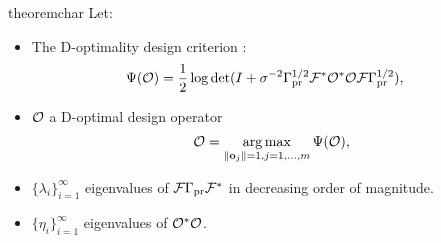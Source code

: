 \begin{restatable}{theorem}{char}\label{thm:char}
  Let:
  \begin{itemize}
    \item The D-optimality design criterion
    \cite{AlexanderianGloorGhattas14}:
    \begin{align*}
      \begin{split}
        \tar(\obs) %
        &= \frac12 \log \det ( I + \sigma^{-2} \prcov^{1/2} \fwd ^*
        \obs^* \obs \fwd \prcov^{1/2}), 
      \end{split}
    \end{align*}
  \item \(\mathcal{O}\) a D-optimal design operator
    \begin{equation*}
      \obs = \argmax_{\|\meas_j\| = 1, j=1,\dots,m}\tar(\obs),
    \end{equation*}
  \item \(\{\lambda_i\}_{i=1}^\infty\) eigenvalues of
    \(\mathcal{F}\Gamma_{\textup{pr}}\mathcal{F}^*\) in decreasing order of magnitude.
  \item \(\{\eta_i\}_{i=1}^\infty\) eigenvalues of \(\mathcal{O}^*\mathcal{O}\).
 
  \end{itemize}


\end{restatable}
